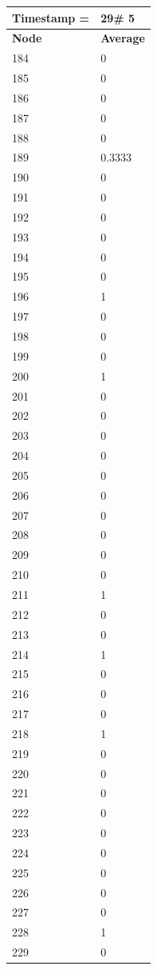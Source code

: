 \begin{tabular}{|l||l|}
\hline
\textbf{Timestamp =} & \textbf{29}\# 5\\\hline
	\textbf{Node} & \textbf{Average} \\ \hline
\hline
	184 & 0 \\ \hline
	185 & 0 \\ \hline
	186 & 0 \\ \hline
	187 & 0 \\ \hline
	188 & 0 \\ \hline
	189 & 0.3333 \\ \hline
	190 & 0 \\ \hline
	191 & 0 \\ \hline
	192 & 0 \\ \hline
	193 & 0 \\ \hline
	194 & 0 \\ \hline
	195 & 0 \\ \hline
	196 & 1 \\ \hline
	197 & 0 \\ \hline
	198 & 0 \\ \hline
	199 & 0 \\ \hline
	200 & 1 \\ \hline
	201 & 0 \\ \hline
	202 & 0 \\ \hline
	203 & 0 \\ \hline
	204 & 0 \\ \hline
	205 & 0 \\ \hline
	206 & 0 \\ \hline
	207 & 0 \\ \hline
	208 & 0 \\ \hline
	209 & 0 \\ \hline
	210 & 0 \\ \hline
	211 & 1 \\ \hline
	212 & 0 \\ \hline
	213 & 0 \\ \hline
	214 & 1 \\ \hline
	215 & 0 \\ \hline
	216 & 0 \\ \hline
	217 & 0 \\ \hline
	218 & 1 \\ \hline
	219 & 0 \\ \hline
	220 & 0 \\ \hline
	221 & 0 \\ \hline
	222 & 0 \\ \hline
	223 & 0 \\ \hline
	224 & 0 \\ \hline
	225 & 0 \\ \hline
	226 & 0 \\ \hline
	227 & 0 \\ \hline
	228 & 1 \\ \hline
	229 & 0 \\ \hline
\end{tabular}
